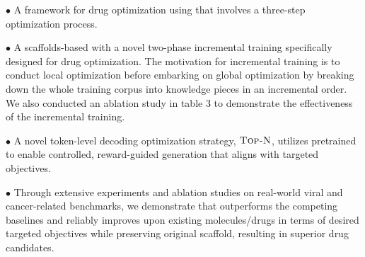 $\bullet$ A framework for drug optimization using  that involves a three-step optimization process. 

$\bullet$ A scaffolds-based   with a novel two-phase incremental training specifically designed for drug optimization. The motivation for incremental training is to conduct local optimization before embarking on global optimization by breaking down the whole training corpus into knowledge pieces in an incremental order. We also conducted an ablation study in table 3 to demonstrate the effectiveness of the incremental training.



$\bullet$ A novel token-level decoding optimization strategy, $\textsc{Top-N}$, utilizes pretrained  to enable controlled, reward-guided generation that aligns with targeted objectives.

$\bullet$ Through extensive experiments and ablation studies on real-world viral and cancer-related benchmarks, we demonstrate that \algname outperforms the competing baselines
and reliably improves upon existing molecules/drugs in terms of desired targeted objectives while preserving original scaffold, resulting in superior drug candidates.

















